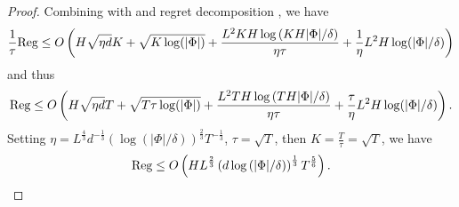 \begin{proof}
Combining with  and regret decomposition , we have 
\begin{align*}
    \frac{1}{\tau}\text{\rmfamily Reg} \le O\left(H\sqrt{\eta d}K + \sqrt{K\log(|\Phi|)} +  \frac{ L^2KH\log\left(KH|\Phi|/\delta\right)}{\eta \tau} +  \frac{1}{\eta} L^2H\log(|\Phi|/\delta)\right)
\end{align*}
and thus 
\begin{align*}
   \text{\rmfamily Reg} \le O\left(H\sqrt{\eta d}T + \sqrt{T\tau\log(|\Phi|)} +  \frac{ L^2TH\log\left(TH|\Phi|/\delta\right)}{\eta \tau} +  \frac{\tau}{\eta} L^2H\log(|\Phi|/\delta)\right).
\end{align*}
Setting $\eta = L^{\frac{4}{3}}d^{-\frac{1}{3}}(\log(|\Phi|/\delta))^{\frac{2}{3}} T^{-\frac{1}{3}}$, $\tau = \sqrt{T}$, then $K = \frac{T}{\tau} = \sqrt{T}$, we have
\begin{align*}
    \text{\rmfamily Reg} \le O\left(H L^{\frac{2}{3}}\left(d\log\left(|\Phi|/\delta\right)\right)^{\frac{1}{3}}T^{\frac{5}{6}}\right). 
\end{align*}

\end{proof}
